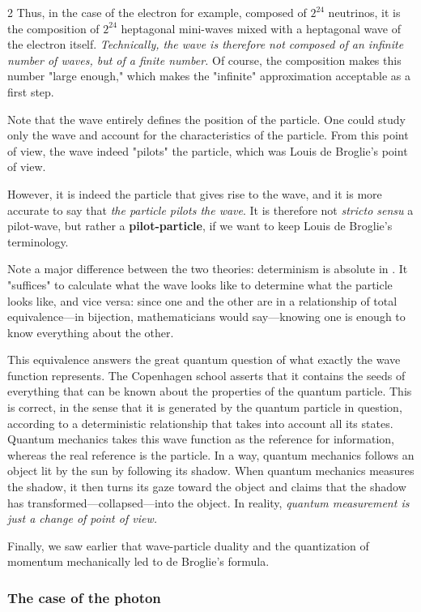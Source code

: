 \begin{multicols}{2}
	Thus, in the case of the electron for example, composed of $2^{24}$ neutrinos, it is the composition of $2^{24}$ heptagonal mini-waves mixed with a heptagonal wave of the electron itself. \textit{Technically, the wave is therefore not composed of an infinite number of waves, but of a finite number.} Of course, the composition makes this number "large enough," which makes the "infinite" approximation acceptable as a first step.
	
	Note that the wave entirely defines the position of the particle. One could study only the wave and account for the characteristics of the particle. From this point of view, the wave indeed "pilots" the particle, which was Louis de Broglie's point of view.\cite{debroglie1924recherches}
	
	However, it is indeed the particle that gives rise to the wave, and it is more accurate to say that \textit{the particle pilots the wave}. It is therefore not \textit{stricto sensu} a pilot-wave, but rather a \textbf{pilot-particle}, if we want to keep Louis de Broglie's terminology.
	
	Note a major difference between the two theories: determinism is absolute in \PQ. It "suffices" to calculate what the wave looks like to determine what the particle looks like, and vice versa: since one and the other are in a relationship of total equivalence—in bijection, mathematicians would say—knowing one is enough to know everything about the other.
	
	This equivalence answers the great quantum question of what exactly the wave function represents. The Copenhagen school asserts that it contains the seeds of everything that can be known about the properties of the quantum particle. This is correct, in the sense that it is generated by the quantum particle in question, according to a deterministic relationship that takes into account all its states. Quantum mechanics takes this wave function as the reference for information, whereas the real reference is the particle. In a way, quantum mechanics follows an object lit by the sun by following its shadow. When quantum mechanics measures the shadow, it then turns its gaze toward the object and claims that the shadow has transformed—collapsed—into the object. In reality, \textit{quantum measurement is just a change of point of view.}
	
	Finally, we saw earlier that wave-particle duality and the quantization of momentum mechanically led to de Broglie's formula.
	
	\subsubsection{The case of the photon}
	

\end{multicols}
